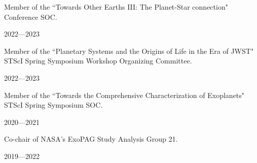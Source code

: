 \documentclass[12pt, a4paper]{article} %
\begin{document}
\vspace{0.2cm}

\begin{minipage}[t]{0.7\textwidth}
\begin{flushleft}%
  \setlength{\leftskip}{0.2cm}%
Member of the ``Towards Other Earths III: The Planet-Star connection" Conference SOC.
\end{flushleft}
\end{minipage}
\begin{minipage}[t]{0.3\textwidth}
\hfill 2022---2023
\end{minipage}

\vspace{0.2cm}

\begin{minipage}[t]{0.7\textwidth}
\begin{flushleft}%
  \setlength{\leftskip}{0.2cm}%
Member of the ``Planetary Systems and the Origins of Life in the Era of JWST" STScI Spring Symposium Workshop Organizing Committee.
\end{flushleft}
\end{minipage}
\begin{minipage}[t]{0.3\textwidth}
\hfill 2022---2023
\end{minipage}

\vspace{0.2cm}

\begin{minipage}[t]{0.7\textwidth}
\begin{flushleft}%
  \setlength{\leftskip}{0.2cm}%
Member of the ``Towards the Comprehensive Characterization of Exoplanets" STScI Spring Symposium SOC.
\end{flushleft}
\end{minipage}
\begin{minipage}[t]{0.3\textwidth}
\hfill 2020---2021
\end{minipage}

\vspace{0.2cm}

\begin{minipage}[t]{0.7\textwidth}
\begin{flushleft}%
  \setlength{\leftskip}{0.2cm}%
Co-chair of NASA's ExoPAG Study Analysis Group 21.
\end{flushleft}
\end{minipage}
\begin{minipage}[t]{0.3\textwidth}
\hfill 2019---2022
\end{minipage}
\end{document}
